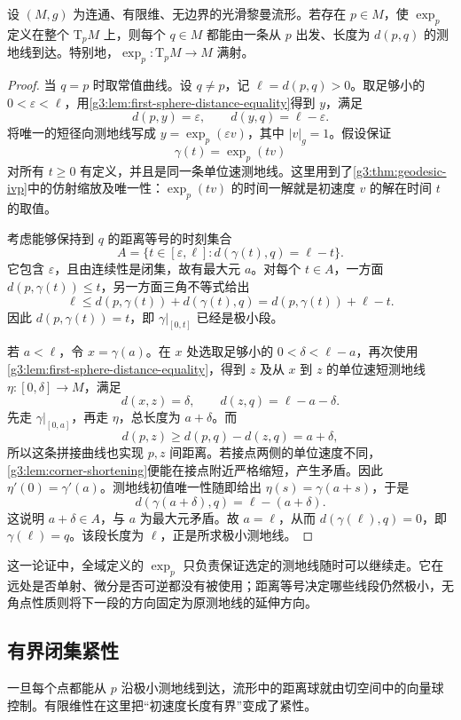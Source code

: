 \begin{proposition}\label{g3:prop:complete-basepoint-minimizers}
	设 \((M,g)\) 为连通、有限维、无边界的光滑黎曼流形。若存在 \(p\in M\)，使 \(\exp_p\) 定义在整个 \(\mathrm T_pM\) 上，则每个 \(q\in M\) 都能由一条从 \(p\) 出发、长度为 \(d(p,q)\) 的测地线到达。特别地，\(\exp_p:\mathrm T_pM\rightarrow M\) 满射。
\end{proposition}
\begin{proof}
	当 \(q=p\) 时取常值曲线。设 \(q\ne p\)，记 \(\ell=d(p,q)>0\)。取足够小的 \(0<\varepsilon<\ell\)，用\cref{g3:lem:first-sphere-distance-equality}得到 \(y\)，满足
	\[
		d(p,y)=\varepsilon,\qquad d(y,q)=\ell-\varepsilon.
	\]
	将唯一的短径向测地线写成 \(y=\exp_p(\varepsilon v)\)，其中 \(|v|_g=1\)。假设保证
	\[
		\gamma(t)=\exp_p(tv)
	\]
	对所有 \(t\ge0\) 有定义，并且是同一条单位速测地线。这里用到了\cref{g3:thm:geodesic-ivp}中的仿射缩放及唯一性：\(\exp_p(tv)\) 的时间一解就是初速度 \(v\) 的解在时间 \(t\) 的取值。

	考虑能够保持到 \(q\) 的距离等号的时刻集合
	\[
		A=\{t\in[\varepsilon,\ell]:d(\gamma(t),q)=\ell-t\}.
	\]
	它包含 \(\varepsilon\)，且由连续性是闭集，故有最大元 \(a\)。对每个 \(t\in A\)，一方面 \(d(p,\gamma(t))\le t\)，另一方面三角不等式给出
	\[
		\ell\le d(p,\gamma(t))+d(\gamma(t),q)
		=d(p,\gamma(t))+\ell-t.
	\]
	因此 \(d(p,\gamma(t))=t\)，即 \(\gamma|_{[0,t]}\) 已经是极小段。

	若 \(a<\ell\)，令 \(x=\gamma(a)\)。在 \(x\) 处选取足够小的 \(0<\delta<\ell-a\)，再次使用\cref{g3:lem:first-sphere-distance-equality}，得到 \(z\) 及从 \(x\) 到 \(z\) 的单位速短测地线 \(\eta:[0,\delta]\rightarrow M\)，满足
	\[
		d(x,z)=\delta,\qquad d(z,q)=\ell-a-\delta.
	\]
	先走 \(\gamma|_{[0,a]}\)，再走 \(\eta\)，总长度为 \(a+\delta\)。而
	\[
		d(p,z)\ge d(p,q)-d(z,q)=a+\delta,
	\]
	所以这条拼接曲线也实现 \(p,z\) 间距离。若接点两侧的单位速度不同，\cref{g3:lem:corner-shortening}便能在接点附近严格缩短，产生矛盾。因此 \(\eta'(0)=\gamma'(a)\)。测地线初值唯一性随即给出 \(\eta(s)=\gamma(a+s)\)，于是
	\[
		d(\gamma(a+\delta),q)=\ell-(a+\delta).
	\]
	这说明 \(a+\delta\in A\)，与 \(a\) 为最大元矛盾。故 \(a=\ell\)，从而 \(d(\gamma(\ell),q)=0\)，即 \(\gamma(\ell)=q\)。该段长度为 \(\ell\)，正是所求极小测地线。
\end{proof}

这一论证中，全域定义的 \(\exp_p\) 只负责保证选定的测地线随时可以继续走。它在远处是否单射、微分是否可逆都没有被使用；距离等号决定哪些线段仍然极小，无角点性质则将下一段的方向固定为原测地线的延伸方向。

\subsection{有界闭集紧性}
\label{g3:subsec:0203:03}
一旦每个点都能从 \(p\) 沿极小测地线到达，流形中的距离球就由切空间中的向量球控制。有限维性在这里把“初速度长度有界”变成了紧性。

